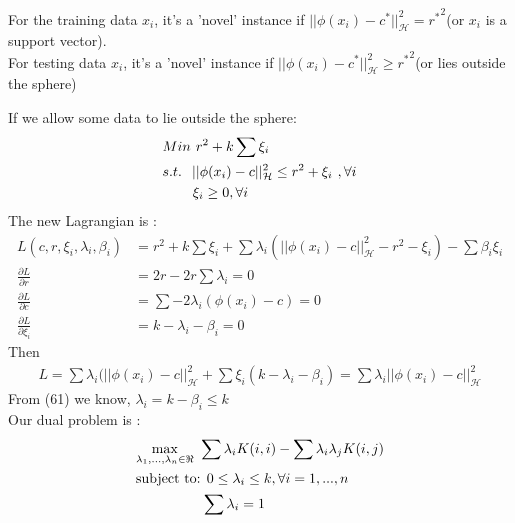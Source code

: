 \documentclass{article}
\newenvironment{sub}[2][$-$]{\begin{trivlist}
		\item[\hskip \labelsep {\bfseries #1}\hskip \labelsep {\bfseries #2.}]}  {\end{trivlist}}
\begin{document}
\begin{sub}{9.7}
\end{sub}
For the training data $x_i$, it's a 'novel' instance if $||\phi(x_i) - c^*||^2_\mathcal{H} = {r^*}^2 $(or $x_i$ is a support vector).\\
For testing data $x_i$, it's a 'novel' instance if  $||\phi(x_i) - c^*||^2_\mathcal{H} \geq {r^*}^2 $(or lies outside the sphere)


\begin{sub}{9.8}
\end{sub}
If we allow some data to lie outside the sphere:
\begin{align}
&Min \hspace{0.05in} r^2 + k \sum \xi_i \\
&s.t. \hspace{0.1in}||\phi(x_i) - c||_{\mathcal{H}}^2 \leq r^2 + \xi_i\hspace{0.05in} ,\forall i\\
& \hspace{0.3in}\xi_i \geq 0 ,\forall i
\end{align}
The new Lagrangian is :
\begin{align}
L(c,r,\xi_i,\lambda_i,\beta_i) &= r^2+  k \sum \xi_i  + \sum \lambda_i(||\phi(x_i) - c||_{\mathcal{H}}^2 - r^2 - \xi_i) - \sum \beta_i \xi_i\\
\frac{\partial L}{\partial r} &= 2r -2r \sum \lambda_i= 0 \\
\frac{\partial L}{\partial c} &= \sum -2 \lambda_i (\phi(x_i) - c) = 0 \\
\frac{\partial L}{\partial \xi_i} &= k - \lambda_i - \beta_i = 0
\end{align}
Then 
\begin{align}
L =  \sum \lambda_i(||\phi(x_i) - c||_{\mathcal{H}}^2 + \sum \xi_i(k - \lambda_i - \beta_i) =  \sum \lambda_i ||\phi(x_i) - c||_{\mathcal{H}}^2 
\end{align}
From (61) we know, $\lambda_i = k - \beta_i \leq k $\\
Our dual problem is :
\begin{align}
 &  \underset{\lambda_1,...,\lambda_n \in \Re}{\operatorname{max}} \hspace{0.05in} 
 \sum \lambda_i K(i,i) - \sum \lambda_i\lambda_j K(i,j) \\
 & \text{subject to: } 0\leq \lambda_i \leq k , \forall i = 1,..., n\\
 &\hspace{0.65in}  \sum \lambda_i = 1
\end{align}
\end{document}
